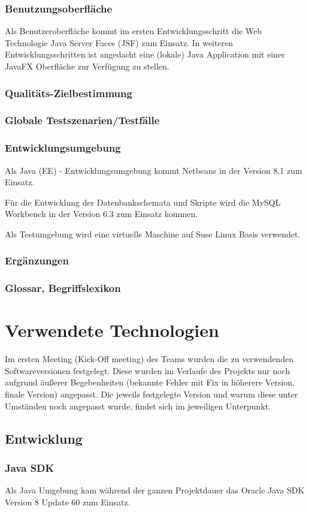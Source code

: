 \documentclass[12pt,a4paper,parskip]{scrreprt}
\begin{document}
\subsection{Benutzungsoberfläche}
Als Benutzeroberfläche kommt im ersten Entwicklungsschritt die Web Technologie Java Server Faces (JSF) zum Einsatz. In weiteren Entwicklungsschritten ist angedacht eine (lokale) Java Application mit einer JavaFX Oberfläche zur Verfügung zu stellen.
\subsection{Qualitäts-Zielbestimmung}
\subsection{Globale Testszenarien/Testfälle}
\subsection{Entwicklungsumgebung}
Als Java (EE) - Entwicklungsumgebung kommt Netbeans in der Version 8.1 zum Einsatz.

Für die Entwicklung der Datenbankschemata und Skripte wird die MySQL Workbench in der Version 6.3 zum Einsatz kommen.

Als Testumgebung wird eine virtuelle Maschine auf Suse Linux Basis verwendet. 
\subsection{Ergänzungen}
\subsection{Glossar, Begriffslexikon}
\chapter{Verwendete Technologien}
Im ersten Meeting (Kick-Off meeting) des Teams wurden die zu verwendenden Softwareversionen festgelegt. Diese wurden im Verlaufe des Projekts nur noch aufgrund äußerer Begebenheiten (bekannte Fehler mit Fix in höherere Version, finale Version) angepasst. Die jeweils festgelegte Version und warum diese unter Umständen noch angepasst wurde, findet sich im jeweiligen Unterpunkt.
\section{Entwicklung}
\subsection{Java SDK}
Als Java Umgebung kam während der ganzen Projektdauer das Oracle Java SDK Version 8 Update 60 zum Einsatz.
\end{document}
